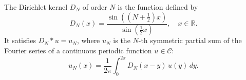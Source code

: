 The Dirichlet kernel $D_N$ of order $N$ is the function defined by
$$D_N(x) = \frac{\sin\left((N + \tfrac{1}{2})x\right)}{\sin\left(\tfrac{1}{2}x\right)}, \quad x \in \mathbb{R}.$$
It satisfies $D_N * u = u_N$, where $u_N$ is the $N$-th symmetric partial sum of the Fourier series of a continuous periodic function $u \in \mathcal{C}$:
$$u_N(x) = \frac{1}{2\pi} \int_0^{2\pi} D_N(x - y) \, u(y) \, dy.$$
